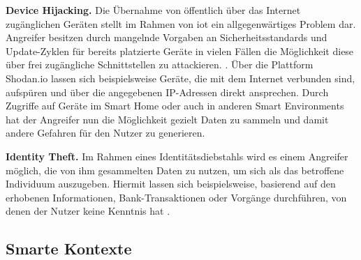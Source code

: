 
\noindent \textbf{Device Hijacking.}
Die Übernahme von öffentlich über das Internet zugänglichen Geräten stellt im Rahmen von \ac{iot} ein allgegenwärtiges Problem dar. Angreifer besitzen durch mangelnde Vorgaben an Sicherheitsstandards und Update-Zyklen für bereits platzierte Geräte in vielen Fällen die Möglichkeit diese über frei zugängliche Schnittstellen zu attackieren. \cite{SecPrivSmartCity2021}. Über die Plattform Shodan.io \cite{Shodan2022} lassen sich beispielsweise Geräte, die mit dem Internet verbunden sind, aufspüren und über die angegebenen IP-Adressen direkt ansprechen. Durch Zugriffe auf Geräte im Smart Home oder auch in anderen Smart Environments hat der Angreifer nun die Möglichkeit gezielt Daten zu sammeln und damit andere Gefahren für den Nutzer zu generieren.


\noindent \textbf{Identity Theft.}
Im Rahmen eines Identitätsdiebstahls wird es einem Angreifer möglich, die von ihm gesammelten Daten zu nutzen, um sich als das betroffene Individuum auszugeben. Hiermit lassen sich beispielsweise, basierend auf den erhobenen Informationen, Bank-Transaktionen oder Vorgänge durchführen, von denen der Nutzer keine Kenntnis hat \cite{SecPrivSmartCity2021}.

\subsection{Smarte Kontexte}
\label{sec:Grundlagen:ssec:Smarte Kontexte}

